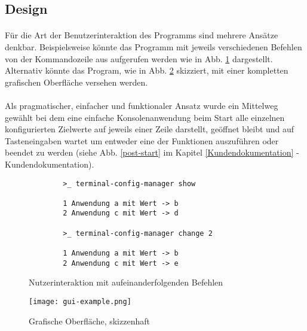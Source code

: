 \subsection{Design}
\paragraph{}
Für die Art der Benutzerinteraktion des Programms sind mehrere Ansätze denkbar.
Beispielsweise könnte das Programm mit jeweils verschiedenen Befehlen von der
Kommandozeile aus aufgerufen werden wie in Abb. \ref{simple-gui-example} dargestellt.
Alternativ könnte das Program, wie in Abb. \ref{graphical-gui-example} skizziert,
mit einer kompletten grafischen Oberfläche versehen werden.

\paragraph{}
Als pragmatischer, einfacher und funktionaler Ansatz wurde ein Mittelweg gewählt
bei dem eine einfache Konsolenanwendung beim Start alle einzelnen konfigurierten
Zielwerte auf jeweils einer Zeile darstellt, geöffnet bleibt und auf Tasteneingaben
wartet um entweder eine der Funktionen auszuführen oder beendet zu werden (siehe Abb. \ref{post-start}
im Kapitel \ref{Kundendokumentation} - Kundendokumentation).


\begin{figure}
    \caption{Nutzerinteraktion mit aufeinanderfolgenden Befehlen}
    \label{simple-gui-example}
    \begin{verbatim}
        >_ terminal-config-manager show
    
        1 Anwendung a mit Wert -> b
        2 Anwendung c mit Wert -> d
    
        >_ terminal-config-manager change 2
    
        1 Anwendung a mit Wert -> b
        2 Anwendung c mit Wert -> e
    \end{verbatim}
\end{figure}

\begin{figure}
    \caption{Grafische Oberfläche, skizzenhaft}
    \label{graphical-gui-example}
    \centering\texttt{[image: gui-example.png]}
\end{figure}
